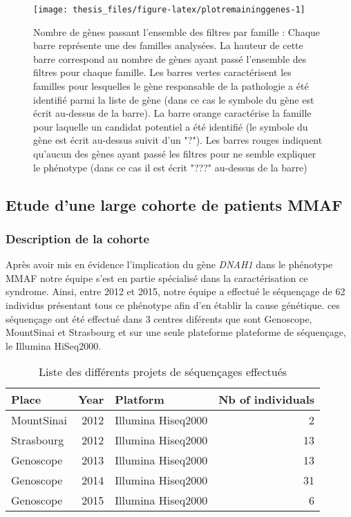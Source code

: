 \documentclass[12pt,twoside]{reedthesis}
\theoremstyle{definition}
\theoremstyle{definition}
\theoremstyle{remark}
\begin{document}
  \begin{figure}
  
  {\centering \texttt{[image: thesis\_files/figure-latex/plotremaininggenes-1]} 
  
  }
  
  \caption[Nombre de gènes passant l'ensemble des filtres par famille]{Nombre de gènes passant l'ensemble des filtres par famille  :  Chaque barre représente une des familles analysées. La hauteur de cette barre correspond au nombre de gènes ayant passé l'ensemble des filtres pour chaque famille. Les barres vertes caractérisent les familles pour lesquelles le gène responsable de la pathologie a été identifié parmi la liste de gène (dans ce cas le symbole du gène est écrit au-dessus de la barre). La barre orange caractérise la famille pour laquelle un candidat potentiel a été identifié (le symbole du gène est écrit au-dessus suivit d'un "?"). Les barres rouges indiquent qu'aucun des gènes ayant passé les filtres pour ne semble expliquer le phénotype (dans ce cas il est écrit "???" au-dessus de la barre)}\label{fig:plotremaininggenes}
  \end{figure}
  
  \newpage
  
  \subsection{Etude d'une large cohorte de patients
  MMAF}\label{cohortemmah}
  
  \subsubsection{Description de la
  cohorte}\label{description-de-la-cohorte}
  
  Après avoir mis en évidence l'implication du gène \emph{DNAH1} dans le
  phénotype MMAF notre équipe s'est en partie spécialisé dans la
  caractérisation ce syndrome. Ainsi, entre 2012 et 2015, notre équipe a
  effectué le séquençage de 62 individus présentant tous ce phénotype afin
  d'en établir la cause génétique. ces séquençage ont été effectué dans 3
  centres diférents que sont Genoscope, MountSinai et Strasbourg et sur
  une seule plateforme plateforme de séquençage, le Illumina HiSeq2000.
  
  \begin{longtable}[t]{lrlr}
  \caption{\label{tab:tabcohort}Liste des différents projets de séquençages effectués}\\
  \toprule
  Place & Year & Platform & Nb of individuals\\
  \midrule
  MountSinai & 2012 & Illumina Hiseq2000 & 2\\
  Strasbourg & 2012 & Illumina Hiseq2000 & 13\\
  Genoscope & 2013 & Illumina Hiseq2000 & 13\\
  Genoscope & 2014 & Illumina Hiseq2000 & 31\\
  Genoscope & 2015 & Illumina Hiseq2000 & 6\\
  \bottomrule
  \end{longtable}
  
\end{document}
